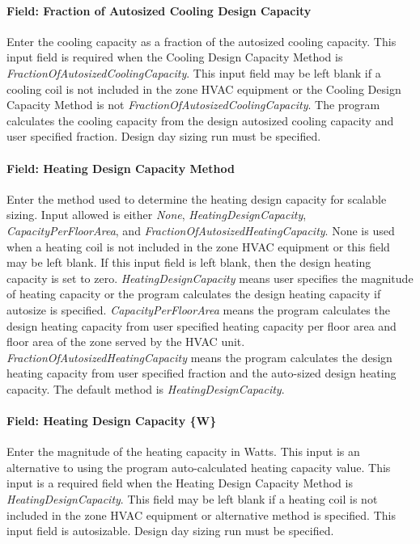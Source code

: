 \paragraph{Field: Fraction of Autosized Cooling Design Capacity}\label{field-fraction-of-autosized-cooling-design-capacity}

Enter the cooling capacity as a fraction of the autosized cooling capacity. This input field is required when the Cooling Design Capacity Method is \emph{FractionOfAutosizedCoolingCapacity}. This input field may be left blank if a cooling coil is not included in the zone HVAC equipment or the Cooling Design Capacity Method is not \emph{FractionOfAutosizedCoolingCapacity}. The program calculates the cooling capacity from the design autosized cooling capacity and user specified fraction. Design day sizing run must be specified.

\paragraph{Field: Heating Design Capacity Method}\label{field-heating-design-capacity-method}

Enter the method used to determine the heating design capacity for scalable sizing. Input allowed is either \emph{None}, \emph{HeatingDesignCapacity}, \emph{CapacityPerFloorArea}, and \emph{FractionOfAutosizedHeatingCapacity}. None is used when a heating coil is not included in the zone HVAC equipment or this field may be left blank. If this input field is left blank, then the design heating capacity is set to zero. \emph{HeatingDesignCapacity} means user specifies the magnitude of heating capacity or the program calculates the design heating capacity if autosize is specified. \emph{CapacityPerFloorArea} means the program calculates the design heating capacity from user specified heating capacity per floor area and floor area of the zone served by the HVAC unit. \emph{FractionOfAutosizedHeatingCapacity} means the program calculates the design heating capacity from user specified fraction and the auto-sized design heating capacity. The default method is \emph{HeatingDesignCapacity}.

\paragraph{Field: Heating Design Capacity \{W\}}\label{field-heating-design-capacity-w}

Enter the magnitude of the heating capacity in Watts. This input is an alternative to using the program auto-calculated heating capacity value. This input is a required field when the Heating Design Capacity Method is \emph{HeatingDesignCapacity}. This field may be left blank if a heating coil is not included in the zone HVAC equipment or alternative method is specified. This input field is autosizable. Design day sizing run must be specified.

